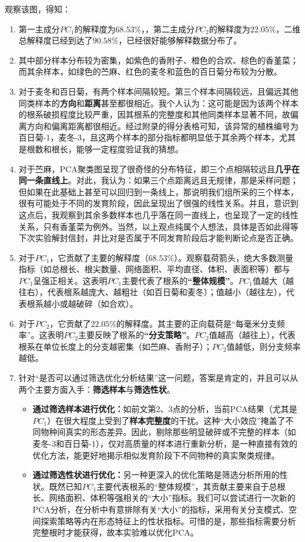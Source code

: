 \documentclass[10.5pt]{config}
\begin{document}
观察该图，得知：
\begin{enumerate}
    \item 第一主成分$PC_1$的解释度为$68.53\%$，，第二主成分$PC_2$的解释度为$22.05\%$，二维总解释度已经到达了$90.58\%$，已经很好能够解释数据分布了。
    \item 其中部分样本分布较为密集，如紫色的香附子、橙色的合欢、棕色的香堇菜；而其余样本，如绿色的苎麻、红色的麦冬和蓝色的百日菊分布较为分散。
    \item 对于麦冬和百日菊，有两个样本间隔较短。第三个样本间隔较远，且偏远其他同类样本的\textbf{方向}和\textbf{距离}甚至都很相近。我个人认为：这可能是因为该两个样本的根系破损程度比较严重，因其根系的完整度和其他同类样本显著不同，故偏离方向和偏离距离都很相近。经过附录的得分表格可知，该异常的植株编号为百日菊-1，麦冬-3，且这两个样本的部分指标都明显低于其余两个样本，尤其是根数和根长，能够一定程度验证我的猜想。
    \item 对于苎麻，PCA聚类图呈现了很奇怪的分布特征，即三个点相隔较远且\textbf{几乎在同一条直线上}。对此，我认为：如果三个点距离远且无规律，那是采样问题；但如果在此基础上甚至可以回归到一条线上，那说明我们组所采的三个样本，很有可能处于不同的发育阶段，因此呈现出了很强的线性关系。并且，意识到这点后，我观察到其余多数样本也几乎落在同一直线上，也呈现了一定的线性关系，只有香堇菜为例外。当然，以上观点纯属个人想法，具体是否如此得等下次实验解封信封，并比对是否属于不同发育阶段后才能判断论点是否正确。
    \item 对于$PC_1$，它贡献了主要的解释度（$68.53\%$）。观察载荷箭头，绝大多数测量指标（如总根长、根尖数量、网络面积、平均直径、体积、表面积等）都与$PC_1$呈强正相关。这表明$PC_1$主要代表了根系的\textbf{“整体规模”}。$PC_1$值越大（越往右），代表根系越庞大、越粗壮（如百日菊和麦冬）；值越小（越往左），代表根系越小或越破碎（如合欢）。
    \item 对于$PC_2$，它贡献了$22.05\%$的解释度。其主要的正向载荷是“每毫米分支频率”。这表明$PC_2$主要反映了根系的\textbf{“分支策略”}。$PC_2$值越高（越往上），代表根系在单位长度上的分支越密集（如苎麻、香附子）；$PC_2$值越低，则分支频率越低。
    \item 针对“是否可以通过筛选优化分析结果”这一问题，答案是肯定的，并且可以从两个主要方面入手：\textbf{筛选样本}与\textbf{筛选性状}。
        \begin{itemize}\item \textbf{通过筛选样本进行优化：}如前文第2、3点的分析，当前PCA结果（尤其是$PC_1$）在很大程度上受到了\textbf{样本完整度}的干扰。这种“大小效应”掩盖了不同物种间真实的形态差异。因此，剔除那些明显破碎或不完整的样本（如麦冬-3和百日菊-1），仅对高质量的样本进行重新分析，是一种直接有效的优化方法，能更好地揭示相似发育阶段下不同物种的真实聚类规律。    
        \item \textbf{通过筛选性状进行优化：}另一种更深入的优化策略是筛选分析所用的性状。既然已知$PC_1$主要代表根系的“整体规模”，其贡献主要来自于总根长、网络面积、体积等强相关的“大小”指标。我们可以尝试进行一次新的PCA分析，在分析中有意排除有关“大小”的指标，采用有关分支模式、空间探索策略等内在形态特征上的性状指标。可惜的是，那些指标需要分析完整根时才能获得，故本实验难以优化PCA。
\end{itemize}
\end{enumerate}
\end{document}
